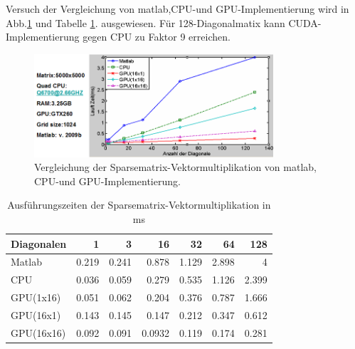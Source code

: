

Versuch der Vergleichung von matlab,CPU-und GPU-Implementierung wird in Abb.\ref{sparse_ergebnis} und Tabelle \ref{tab_sparse_result}. ausgewiesen. Für 128-Diagonalmatix kann CUDA-Implementierung gegen CPU zu Faktor 9 erreichen.


\begin{figure}[htbp]
\includegraphics[width=3.5in]{../xby/pic//sparse_ergebnis}
\caption{Vergleichung der Sparsematrix-Vektormultiplikation von matlab, CPU-und GPU-Implementierung.}
\label{sparse_ergebnis}
\end{figure}


\begin{table}
\renewcommand{\arraystretch}{1.3}
\caption{Ausführungszeiten der Sparsematrix-Vektormultiplikation in ms}
\label{tab_sparse_result}
\centering
\begin{tabular}{|l|r|r|r|r|r|r|}

\hline
Diagonalen& 1& 3& 16& 32& 64 &128\\


\hline
\hline
Matlab     &   0.219   &   0.241&   0.878  &  1.129 &  2.898  & 4\\
CPU        & 	0.036 &   0.059& 	0.279  &  0.535 &  1.126  & 2.399 \\
GPU(1x16)  & 0.051     &   0.062 &  0.204  &  0.376 &  0.787  & 1.666\\
GPU(16x1)  & 0.143     &	0.145 &	0.147  &  0.212 &	0.347 &	0.612\\

GPU(16x16)     & 0.092 &	0.091  &	0.0932 &	0.119&	0.174 &	0.281\\

\hline
\end{tabular}
\end{table}